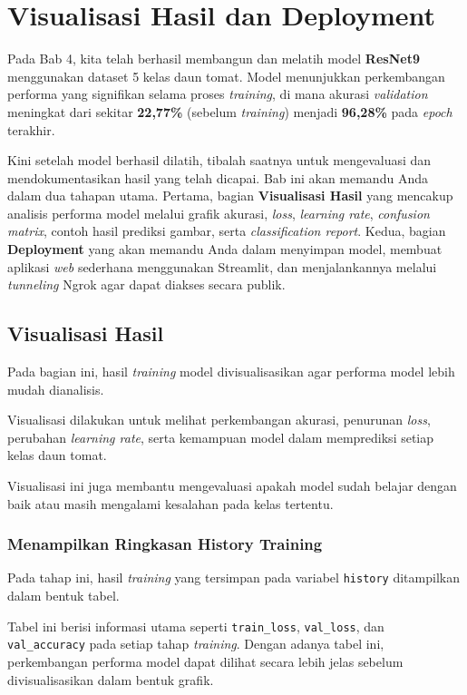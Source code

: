 \chapter{Visualisasi Hasil dan Deployment}

Pada Bab 4, kita telah berhasil membangun dan melatih model \textbf{ResNet9} menggunakan dataset 5 kelas daun tomat. Model menunjukkan perkembangan performa yang signifikan selama proses \textit{training}, di mana akurasi \textit{validation} meningkat dari sekitar \textbf{22,77\%} (sebelum \textit{training}) menjadi \textbf{96,28\%} pada \textit{epoch} terakhir.

Kini setelah model berhasil dilatih, tibalah saatnya untuk mengevaluasi dan mendokumentasikan hasil yang telah dicapai. Bab ini akan memandu Anda dalam dua tahapan utama. Pertama, bagian \textbf{Visualisasi Hasil} yang mencakup analisis performa model melalui grafik akurasi, \textit{loss}, \textit{learning rate}, \textit{confusion matrix}, contoh hasil prediksi gambar, serta \textit{classification report}. Kedua, bagian \textbf{Deployment} yang akan memandu Anda dalam menyimpan model, membuat aplikasi \textit{web} sederhana menggunakan Streamlit, dan menjalankannya melalui \textit{tunneling} Ngrok agar dapat diakses secara publik.

\section{Visualisasi Hasil}

Pada bagian ini, hasil \textit{training} model divisualisasikan agar performa model lebih mudah dianalisis.

Visualisasi dilakukan untuk melihat perkembangan akurasi, penurunan \textit{loss}, perubahan \textit{learning rate}, serta kemampuan model dalam memprediksi setiap kelas daun tomat.

Visualisasi ini juga membantu mengevaluasi apakah model sudah belajar dengan baik atau masih mengalami kesalahan pada kelas tertentu.

\subsection{Menampilkan Ringkasan History Training}

Pada tahap ini, hasil \textit{training} yang tersimpan pada variabel \texttt{history} ditampilkan dalam bentuk tabel.

Tabel ini berisi informasi utama seperti \texttt{train\_loss}, \texttt{val\_loss}, dan \texttt{val\_accuracy} pada setiap tahap \textit{training}. Dengan adanya tabel ini, perkembangan performa model dapat dilihat secara lebih jelas sebelum divisualisasikan dalam bentuk grafik.


